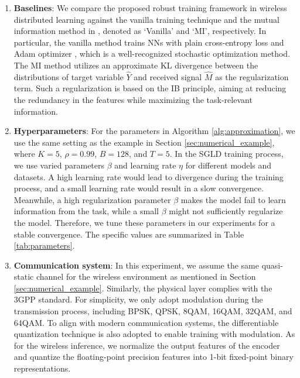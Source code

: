 \documentclass[lettersize,journal]{IEEEtran}
\theoremstyle{definition}
\theoremstyle{plain}
\begin{document}
\begin{enumerate}
    \item \textbf{Baselines}: We compare the proposed robust training framework in wireless distributed learning against the vanilla training technique and the mutual information method in \cite{IB}, denoted as `Vanilla' and `MI', respectively. In particular, the vanilla method trains NNs with plain cross-entropy loss and Adam optimizer \cite{Adam}, which is a well-recognized stochastic optimization method. 
    The MI method utilizes an approximate KL divergence between the distributions of target variable $\hat{Y}$ and received signal $\hat{M}$ as the regularization term. Such a regularization is based on the IB principle, aiming at reducing the redundancy in the features while maximizing the task-relevant information.
    \item \textbf{Hyperparameters}: For the parameters in Algorithm \ref{alg:approximation}, we use the same setting as the example in Section \ref{sec:numerical_example}, where $K=5$, $\rho=0.99$, $B=128$, and $T=5$. In the SGLD training process, we use varied parameters $\beta$ and learning rate $\eta$ for different models and datasets. A high learning rate would lead to divergence during the training process, and a small learning rate would result in a slow convergence. Meanwhile, a high regularization parameter $\beta$ makes the model fail to learn information from the task, while a small $\beta$ might not sufficiently regularize the model. Therefore, we tune these parameters in our experiments for a stable convergence. The specific values are summarized in Table \ref{tab:parameters}.
    \item \textbf{Communication system}: In this experiment, we assume the same quasi-static channel for the wireless environment as mentioned in Section \ref{sec:numerical_example}. Similarly, the physical layer complies with the 3GPP standard. For simplicity, we only adopt modulation during the transmission process, including BPSK, QPSK, 8QAM, 16QAM, 32QAM, and 64QAM. 
    To align with modern communication systems, the differentiable quantization technique is also adopted to enable training with modulation. As for the wireless inference, we normalize the output features of the encoder and quantize the floating-point precision features into 1-bit fixed-point binary representations.
\end{enumerate}
\end{document}
